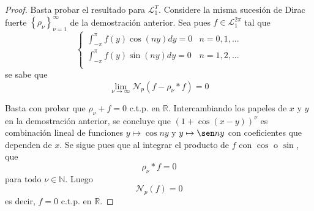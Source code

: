\documentclass[12pt]{report}
\theoremstyle{largebreak}
\newcommand{\N}[2]{\ensuremath{\mathcal{N}_{#1}\left(#2\right)}}
\begin{document}
    \begin{proof}
        Basta probar el resultado para $\mathcal{L}_1^T$. Considere la misma sucesión de Dirac fuerte $\left\{\rho_\nu \right\}_{\nu=1}^\infty$ de la demostración anterior. Sea pues $f\in\mathcal{L}_1^{2\pi}$ tal que
        \begin{equation*}
            \left\{
                \begin{array}{cr}
                    \int_{-\pi}^{\pi}f(y)\cos(ny)dy=0 & n=0,1,...\\
                    \int_{-\pi}^{\pi}f(y)\sin(ny)dy=0 & n=1,2,...\\
                \end{array}
            \right.
        \end{equation*}
        se sabe que
        \begin{equation*}
            \lim_{\nu\rightarrow\infty}\N{p}{f-\rho_\nu*f}=0
        \end{equation*}
    
        Basta con probar que $\rho_\nu+f=0$ c.t.p. en $\mathbb{R}$. Intercambiando los papeles de $x$ y $y$ en la demostración anterior, se concluye que $(1+\cos(x-y))^\nu$ es combinación lineal de funciones $y\mapsto\cos ny$ y $y\mapsto\sen ny$ con coeficientes que dependen de $x$. Se sigue pues que al integrar el producto de $f$ con $\cos$ o $\sin$, que
        \begin{equation*}
            \rho_\nu*f=0
        \end{equation*}
        para todo $\nu\in\mathbb{N}$. Luego
        \begin{equation*}
            \N{p}{f}=0
        \end{equation*}
        es decir, $f=0$ c.t.p. en $\mathbb{R}$.
        
    \end{proof}
\end{document}
